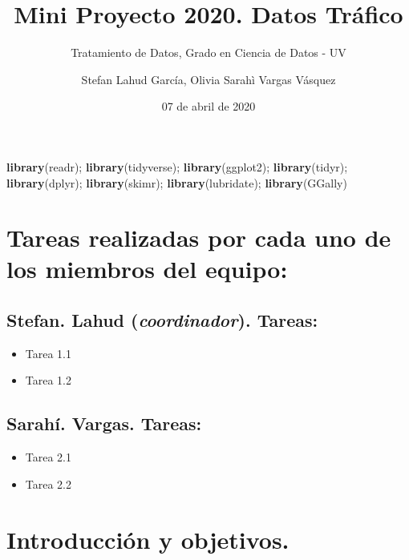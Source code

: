 \documentclass[]{article}
\title{Mini Proyecto 2020. Datos Tráfico}
\subtitle{Tratamiento de Datos, Grado en Ciencia de Datos - UV}
\author{Stefan Lahud García, Olivia Sarahì Vargas Vásquez}
\date{07 de abril de 2020}
\newenvironment{Shaded}{\begin{snugshade}}{\end{snugshade}}
\newcommand{\KeywordTok}[1]{\textcolor[rgb]{0.13,0.29,0.53}{\textbf{{#1}}}}
\newcommand{\NormalTok}[1]{{#1}}
\providecommand{\tightlist}{%
  \setlength{\itemsep}{0pt}\setlength{\parskip}{0pt}}
\begin{document}
\maketitle

{
\setcounter{tocdepth}{2}
\tableofcontents
}
\begin{Shaded}
\begin{Highlighting}[]
\KeywordTok{library}\NormalTok{(readr); }\KeywordTok{library}\NormalTok{(tidyverse); }\KeywordTok{library}\NormalTok{(ggplot2); }\KeywordTok{library}\NormalTok{(tidyr); }\KeywordTok{library}\NormalTok{(dplyr); }\KeywordTok{library}\NormalTok{(skimr); }\KeywordTok{library}\NormalTok{(lubridate); }\KeywordTok{library}\NormalTok{(GGally)}
\end{Highlighting}
\end{Shaded}

\section{Tareas realizadas por cada uno de los miembros del
equipo:}\label{tareas-realizadas-por-cada-uno-de-los-miembros-del-equipo}

\subsection{\texorpdfstring{Stefan. Lahud (\emph{coordinador}).
Tareas:}{Stefan. Lahud (coordinador). Tareas:}}\label{stefan.-lahud-coordinador.-tareas}

\begin{itemize}
\tightlist
\item
  Tarea 1.1
\item
  Tarea 1.2
\end{itemize}

\subsection{Sarahí. Vargas. Tareas:}\label{sarahi.-vargas.-tareas}

\begin{itemize}
\tightlist
\item
  Tarea 2.1
\item
  Tarea 2.2
\end{itemize}

\section{Introducción y objetivos.}\label{introduccion-y-objetivos.}
\end{document}
